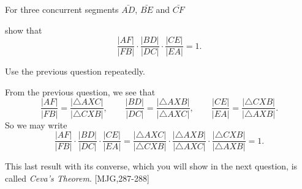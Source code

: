 \documentclass{ximera}
\begin{document}
\begin{question}
\label{28}  For three concurrent segments $\bar{AD}$,
$\bar{BE}$ and $\bar{CF}$
\begin{image}
\end{image}
show that
\[
\frac{|AF|}{|FB|}\cdot\frac{|BD|}{|DC|}\cdot\frac{|CE|}{|EA|}=1.
\]
\begin{solution}
\begin{hint}
Use the previous question repeatedly.
\end{hint}
\begin{freeResponse}
From the previous question, we see that
\[
\frac{|AF|}{|FB|}=\frac{|\triangle AXC|}{|\triangle CXB|},\qquad
\frac{|BD|}{|DC|}=\frac{|\triangle AXB|}{|\triangle AXC|},\qquad
\frac{|CE|}{|EA|}=\frac{|\triangle CXB|}{|\triangle AXB|}.
\]
So we may write
\[
\frac{|AF|}{|FB|}\cdot\frac{|BD|}{|DC|}\cdot\frac{|CE|}{|EA|} = 
\frac{|\triangle AXC|}{|\triangle CXB|}\cdot 
\frac{|\triangle AXB|}{|\triangle AXC|}\cdot
\frac{|\triangle CXB|}{|\triangle AXB|} = 1.
\]
\end{freeResponse}
\end{solution}
\end{question}

This last result with its converse, which you will show in the next question,
is called \textit{Ceva's Theorem}. [MJG,287-288]
\end{document}
